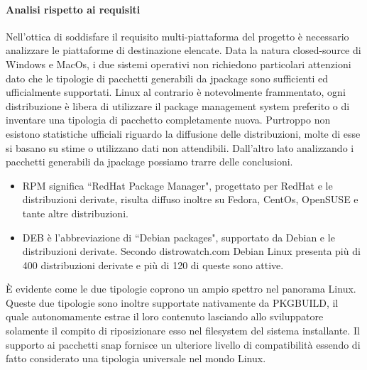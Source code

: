\paragraph{Analisi rispetto ai requisiti}
Nell'ottica di soddisfare il requisito multi-piat\-ta\-for\-ma del progetto è necessario analizzare le piattaforme di destinazione elencate. Data la natura closed-source di Windows e MacOs, i due sistemi operativi non richiedono particolari attenzioni dato che le tipologie di pacchetti generabili da jpackage sono sufficienti ed ufficialmente supportati. Linux al contrario è notevolmente frammentato, ogni distribuzione è libera di utilizzare il package management system preferito o di inventare una tipologia di pacchetto completamente nuova. Purtroppo non esistono statistiche ufficiali riguardo la diffusione delle distribuzioni, molte di esse si basano su stime o utilizzano dati non attendibili. Dall'altro lato analizzando i pacchetti generabili da jpackage possiamo trarre delle conclusioni.
\begin{itemize}
	\item RPM significa ``RedHat Package Manager", progettato per RedHat e le distribuzioni derivate, risulta diffuso inoltre su Fedora, CentOs, OpenSUSE e tante altre distribuzioni. 
	\item DEB è l'abbreviazione di ``Debian packages", supportato da Debian e le distribuzioni derivate. Secondo distrowatch.com Debian Linux presenta più di 400 distribuzioni derivate e più di 120 di queste sono attive.
\end{itemize}
È evidente come le due tipologie coprono un ampio spettro nel panorama Linux. Queste due tipologie sono inoltre supportate nativamente da PKGBUILD, il quale autonomamente estrae il loro contenuto lasciando allo sviluppatore solamente il compito di riposizionare esso nel filesystem del sistema installante. Il supporto ai pacchetti snap fornisce un ulteriore livello di compatibilità essendo di fatto considerato una tipologia universale nel mondo Linux.
